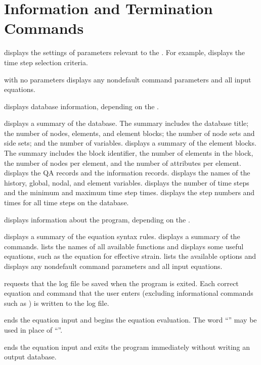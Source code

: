 \newpage
\section{Information and Termination Commands} \label{cmd:infoterm}

 {
 displays the settings of parameters relevant to the
. For example,  displays the time step
selection criteria.

 with no parameters displays any nondefault command parameters
and all input equations.
}

 {
 displays database information, depending on the
.

 {
displays a summary of the database. The summary includes the database
title; the number of nodes, elements, and element blocks; the number of
node sets and side sets; and the number of variables.
}
 {
displays a summary of the element blocks. The summary includes the block
identifier, the number of elements in the block, the number of nodes per
element, and the number of attributes per element.
}
 {
displays the QA records and the information records.
}
 {
displays the names of the history, global, nodal, and element variables.
}
 {
displays the number of time steps and the minimum and maximum time step
times.
}
 {
displays the step numbers and times for all time steps on the database.
}
}

\newpage %
 {
 displays information about the \caps{\PROGRAM} program,
depending on the .

 {
displays a summary of the equation syntax rules.
}
 {
displays a summary of the commands.
}
 {
lists the names of all available functions and displays some useful
equations, such as the equation for effective strain.
}
 {
lists the available  options and displays any nondefault
command parameters and all input equations.
}
}

 {
 requests that the log file be saved when the program is
exited. Each correct equation and command that the user enters
(excluding informational commands such as ) is written to the
log file.
}

 {
 ends the equation input and begins the equation evaluation.
The word ``'' may be used in place of ``''.
}

 {
 ends the equation input and exits the program immediately
without writing an output database.
}
